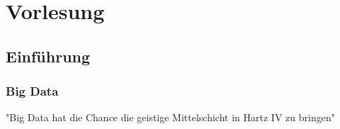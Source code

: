 
\chapter{Vorlesung}
\section{Einführung}

\subsection{Big Data}
"Big Data hat die Chance die geistige Mittelschicht in Hartz IV zu bringen"


